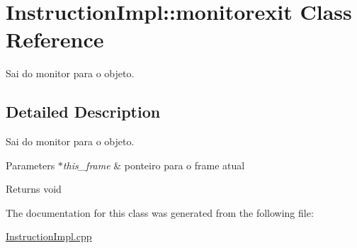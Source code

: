 \hypertarget{class_instruction_impl_1_1monitorexit}{}\section{Instruction\+Impl\+:\+:monitorexit Class Reference}
\label{class_instruction_impl_1_1monitorexit}


Sai do monitor para o objeto.  




\subsection{Detailed Description}
Sai do monitor para o objeto. 


\begin{DoxyParams}{Parameters}
{\em $\ast$this\+\_\+frame} & ponteiro para o frame atual \\
\hline
\end{DoxyParams}
\begin{DoxyReturn}{Returns}
void 
\end{DoxyReturn}


The documentation for this class was generated from the following file\+:\begin{DoxyCompactItemize}
\item 
\hyperlink{_instruction_impl_8cpp}{Instruction\+Impl.\+cpp}\end{DoxyCompactItemize}
